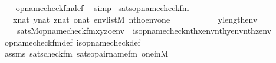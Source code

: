 \begin{isabellebody}
%
\isadelimproof
\ \ %
\endisadelimproof
%
\isatagproof
{}\isamarkupfalse%
\ opname{\isacharunderscore}{\kern0pt}check{\isacharunderscore}{\kern0pt}fm{\isacharunderscore}{\kern0pt}def\ \isamarkupfalse%
\ simp%
\endisatagproof
{\isafoldproof}%
%
\isadelimproof
\isanewline
%
\endisadelimproof
\isanewline
{}\isamarkupfalse%
\ sats{\isacharunderscore}{\kern0pt}opname{\isacharunderscore}{\kern0pt}check{\isacharunderscore}{\kern0pt}fm{\isacharcolon}{\kern0pt}\isanewline
\ \ \ {\isachardoublequoteopen}x{\isasymin}nat{\isachardoublequoteclose}\ {\isachardoublequoteopen}y{\isasymin}nat{\isachardoublequoteclose}\ {\isachardoublequoteopen}z{\isasymin}nat{\isachardoublequoteclose}\ {\isachardoublequoteopen}o{\isasymin}nat{\isachardoublequoteclose}\ {\isachardoublequoteopen}env{\isasymin}list{\isacharparenleft}{\kern0pt}M{\isacharparenright}{\kern0pt}{\isachardoublequoteclose}\ {\isachardoublequoteopen}nth{\isacharparenleft}{\kern0pt}o{\isacharcomma}{\kern0pt}env{\isacharparenright}{\kern0pt}{\isacharequal}{\kern0pt}one{\isachardoublequoteclose}\ \isanewline
\ \ \ \ \ \ \ \ \ \ {\isachardoublequoteopen}y{\isacharless}{\kern0pt}length{\isacharparenleft}{\kern0pt}env{\isacharparenright}{\kern0pt}{\isachardoublequoteclose}\isanewline
\ \ \ \isanewline
\ \ \ \ {\isachardoublequoteopen}sats{\isacharparenleft}{\kern0pt}M{\isacharcomma}{\kern0pt}opname{\isacharunderscore}{\kern0pt}check{\isacharunderscore}{\kern0pt}fm{\isacharparenleft}{\kern0pt}x{\isacharcomma}{\kern0pt}y{\isacharcomma}{\kern0pt}z{\isacharcomma}{\kern0pt}o{\isacharparenright}{\kern0pt}{\isacharcomma}{\kern0pt}env{\isacharparenright}{\kern0pt}\ {\isasymlongleftrightarrow}\ is{\isacharunderscore}{\kern0pt}opname{\isacharunderscore}{\kern0pt}check{\isacharparenleft}{\kern0pt}nth{\isacharparenleft}{\kern0pt}x{\isacharcomma}{\kern0pt}env{\isacharparenright}{\kern0pt}{\isacharcomma}{\kern0pt}nth{\isacharparenleft}{\kern0pt}y{\isacharcomma}{\kern0pt}env{\isacharparenright}{\kern0pt}{\isacharcomma}{\kern0pt}nth{\isacharparenleft}{\kern0pt}z{\isacharcomma}{\kern0pt}env{\isacharparenright}{\kern0pt}{\isacharparenright}{\kern0pt}{\isachardoublequoteclose}\isanewline
%
\isadelimproof
\ \ %
\endisadelimproof
%
\isatagproof
{}\isamarkupfalse%
\ opname{\isacharunderscore}{\kern0pt}check{\isacharunderscore}{\kern0pt}fm{\isacharunderscore}{\kern0pt}def\ is{\isacharunderscore}{\kern0pt}opname{\isacharunderscore}{\kern0pt}check{\isacharunderscore}{\kern0pt}def\ \isanewline
\ \ \isamarkupfalse%
\ assms\ sats{\isacharunderscore}{\kern0pt}check{\isacharunderscore}{\kern0pt}fm\ sats{\isacharunderscore}{\kern0pt}opair{\isacharunderscore}{\kern0pt}name{\isacharunderscore}{\kern0pt}fm\ one{\isacharunderscore}{\kern0pt}in{\isacharunderscore}{\kern0pt}M\ \isamarkupfalse%

\end{isabellebody}
